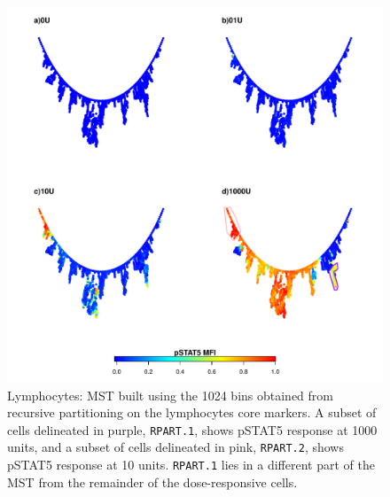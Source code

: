 \begin{figure}
\centering
\includegraphics[scale=.7]{figures/rpart-lymphocytes-mst-1024bin}
{ Lymphocytes: MST built using the 1024 bins obtained from recursive partitioning on the lymphocytes core markers.}
{
A subset of cells delineated in purple, \texttt{RPART.1}, shows pSTAT5 response at 1000 units, and a subset of cells delineated in pink, \texttt{RPART.2}, shows pSTAT5 response at 10 units.
\texttt{RPART.1} lies in a different part of the \gls{MST} from the remainder of the dose-responsive cells.
}
\end{figure}

